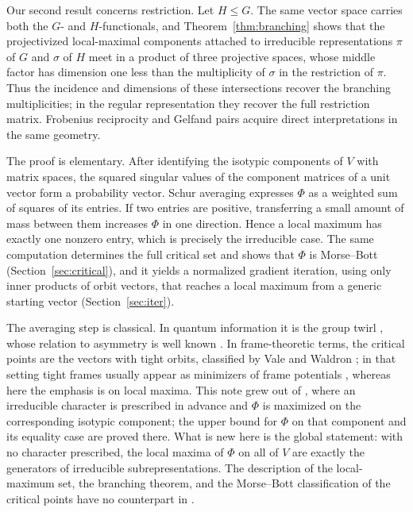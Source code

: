 \documentclass{amsart}
\theoremstyle{remark}
\begin{document}
Our second result concerns restriction. Let $H\le G$. The same vector space carries both the $G$- and
$H$-functionals, and Theorem~\ref{thm:branching} shows that the projectivized local-maximal components
attached to irreducible representations $\pi$ of $G$ and $\sigma$ of $H$ meet in a product of three
projective spaces, whose middle factor has dimension one less than the multiplicity of $\sigma$ in the
restriction of $\pi$. Thus the incidence and dimensions of these intersections recover the branching
multiplicities; in the regular representation they recover the full restriction matrix. Frobenius
reciprocity and Gelfand pairs acquire direct interpretations in the same geometry.
 
The proof is elementary. After identifying the isotypic components of $V$ with matrix spaces, the
squared singular values of the component matrices of a unit vector form a probability vector. Schur
averaging expresses $\Phi$ as a weighted sum of squares of its entries. If two entries are positive,
transferring a small amount of mass between them increases $\Phi$ in one direction. Hence a local
maximum has exactly one nonzero entry, which is precisely the irreducible case. The same computation determines the full critical set and shows
that $\Phi$ is Morse--Bott (Section~\ref{sec:critical}), and it yields a normalized gradient iteration,
using only inner products of orbit vectors, that reaches a local maximum from a generic starting vector
(Section~\ref{sec:iter}).
 
The averaging step is classical. In quantum information it is the group twirl
\cite{BartlettRudolphSpekkens2007}, whose relation to asymmetry is well known
\cite{MarvianSpekkens2014}. In frame-theoretic terms, the critical points are the vectors with
tight orbits, classified by Vale and Waldron \cite[Theorem~6.18]{ValeWaldron2005}; in that setting tight
frames usually appear as minimizers of frame potentials \cite{BenedettoFickus2003,JohnsonOkoudjou2008},
whereas here the emphasis is on local maxima. This note grew out of \cite{HsiehKang2026}, where an
irreducible character is prescribed in advance and $\Phi$ is maximized on the corresponding isotypic
component; the upper bound for $\Phi$ on that component and its equality case are proved there. What
is new here is the global statement: with no character prescribed, the local maxima of $\Phi$ on all
of $V$ are exactly the generators of irreducible subrepresentations. The description of the
local-maximum set, the branching theorem, and the Morse--Bott classification of the critical points
have no counterpart in \cite{HsiehKang2026}.
\end{document}
